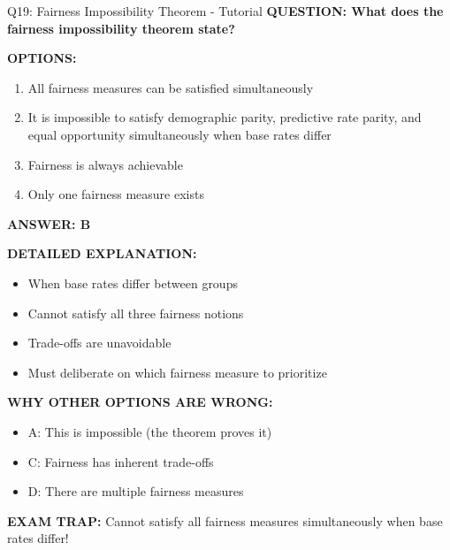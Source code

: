 \documentclass[8pt]{beamer}
\begin{document}
	\begin{frame}{Q19: Fairness Impossibility Theorem - Tutorial}
		\fontsize{6.5}{7.5}\selectfont
		\textbf{QUESTION: What does the fairness impossibility theorem state?}
		
		\vspace{0.1cm}
		\textbf{OPTIONS:}
		\begin{enumerate}
			\item All fairness measures can be satisfied simultaneously
			\item It is impossible to satisfy demographic parity, predictive rate parity, and equal opportunity simultaneously when base rates differ
			\item Fairness is always achievable
			\item Only one fairness measure exists
		\end{enumerate}
		
		\vspace{0.1cm}
		\textcolor{myblue}{\textbf{ANSWER: B}}
		
		\vspace{0.1cm}
		\textbf{DETAILED EXPLANATION:}
		\begin{itemize}
			\item When base rates differ between groups
			\item Cannot satisfy all three fairness notions
			\item Trade-offs are unavoidable
			\item Must deliberate on which fairness measure to prioritize
		\end{itemize}
		
		\vspace{0.1cm}
		\textcolor{myred}{\textbf{WHY OTHER OPTIONS ARE WRONG:}}
		\begin{itemize}
			\item \textcolor{myred}{A:} This is impossible (the theorem proves it)
			\item \textcolor{myred}{C:} Fairness has inherent trade-offs
			\item \textcolor{myred}{D:} There are multiple fairness measures
		\end{itemize}
		
		\textcolor{myred}{\textbf{EXAM TRAP:}} Cannot satisfy \textcolor{myblue}{all fairness measures} simultaneously when base rates differ!
	\end{frame}
	
\end{document}
